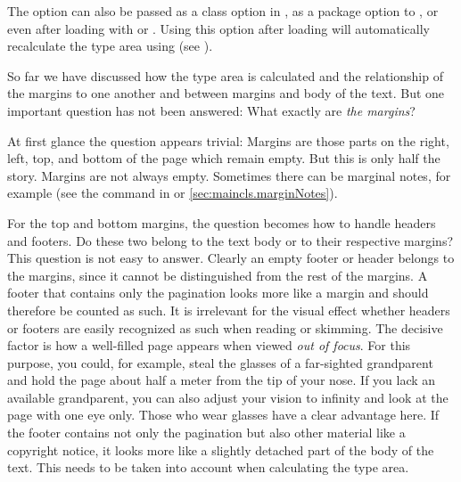 The option can also be passed as a class option in
, as a package option to
, or even after loading 
with  or
. Using this option after loading
 will automatically
recalculate the type area using  (see
).%
%
\EndIndexGroup

\begin{Declaration}
\end{Declaration}%
\begin{Explain}%
  So far we have discussed how the type area is calculated
  and the relationship of the margins to one another and
  between margins and body of the text. But one important question has not
  been answered: What exactly are \emph{the margins}?

  At first glance the question appears trivial: Margins are those parts on the
  right, left, top, and bottom of the page which remain empty. But this is
  only half the story. Margins are not always empty. Sometimes there can be
  marginal notes, for example (see the  command
  in \cite{lshort} or \autoref{sec:maincls.marginNotes}).

  For the top and bottom margins, the question becomes how to handle
  headers and footers. Do these two
  belong to the text body or to their respective margins? This question is not
  easy to answer. Clearly an empty footer or header belongs to the margins,
  since it cannot be distinguished from the rest of the margins. A footer that
  contains only the
  pagination %
  \iffalse %
  \unskip\footnote{Pagination refers to the indication of the page number,
    either inside or outside the type area, and usually appears in either the
    header or the footer of the page.} %
  \fi %
  looks more like a margin and should therefore be counted as such. It is
  irrelevant for the visual effect whether headers or footers are easily
  recognized as such when reading or skimming. The decisive factor is how a
  well-filled page appears when viewed \emph{out of focus}. For this purpose,
  you could, for example, steal the glasses of a far-sighted grandparent and
  hold the page about half a meter from the tip of your nose. If you lack an
  available grandparent, you can also adjust your vision to infinity and look
  at the page with one eye only. Those who wear glasses have a clear advantage
  here. If the footer contains not only the pagination but also other material
  like a copyright notice, it looks more like a slightly detached part of the
  body of the text. This needs to be taken into account when calculating the
  type area.


\end{Explain}
